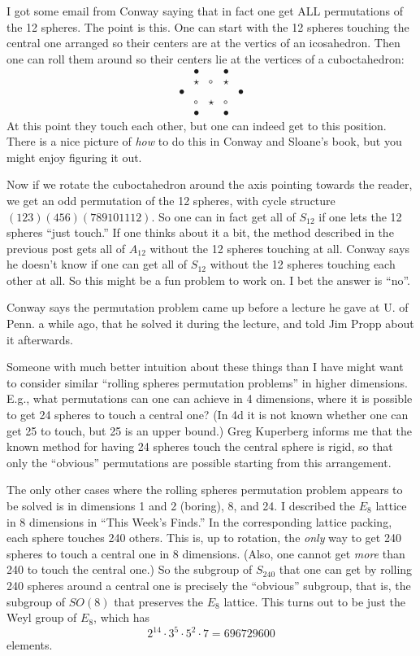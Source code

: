 \documentclass{article}
\begin{document}
I got some email from Conway saying that in fact one get ALL
permutations of the 12 spheres. The point is this. One can start with
the 12 spheres touching the central one arranged so their centers are at
the vertics of an icosahedron. Then one can roll them around so their
centers lie at the vertices of a cuboctahedron: \[
  \begin{array}{ccccc}
    &\bullet&&\bullet&
  \\&\star&\circ&\star&
  \\\bullet&&&&\bullet
  \\&\circ&\star&\circ&
  \\&\bullet&&\bullet&
  \end{array}
\] At this point they touch each other, but one can indeed get to this
position. There is a nice picture of \emph{how} to do this in Conway and
Sloane's book, but you might enjoy figuring it out.

Now if we rotate the cuboctahedron around the axis pointing towards the
reader, we get an odd permutation of the 12 spheres, with cycle
structure \((1 2 3)(4 5 6)(7 8 9 10 11 12)\). So one can in fact get all
of \(S_{12}\) if one lets the 12 spheres ``just touch.'' If one thinks
about it a bit, the method described in the previous post gets all of
\(A_{12}\) without the 12 spheres touching at all. Conway says he
doesn't know if one can get all of \(S_{12}\) without the 12 spheres
touching each other at all. So this might be a fun problem to work on. I
bet the answer is ``no''.

Conway says the permutation problem came up before a lecture he gave at
U. of Penn. a while ago, that he solved it during the lecture, and told
Jim Propp about it afterwards.

Someone with much better intuition about these things than I have might
want to consider similar ``rolling spheres permutation problems'' in
higher dimensions. E.g., what permutations can one can achieve in 4
dimensions, where it is possible to get 24 spheres to touch a central
one? (In 4d it is not known whether one can get 25 to touch, but 25 is
an upper bound.) Greg Kuperberg informs me that the known method for
having 24 spheres touch the central sphere is rigid, so that only the
``obvious'' permutations are possible starting from this arrangement.

The only other cases where the rolling spheres permutation problem
appears to be solved is in dimensions 1 and 2 (boring), 8, and 24. I
described the \(E_8\) lattice in 8 dimensions in ``This Week's Finds.''
In the corresponding lattice packing, each sphere touches 240 others.
This is, up to rotation, the \emph{only} way to get 240 spheres to touch
a central one in 8 dimensions. (Also, one cannot get \emph{more} than
240 to touch the central one.) So the subgroup of \(S_{240}\) that one
can get by rolling 240 spheres around a central one is precisely the
``obvious'' subgroup, that is, the subgroup of \(SO(8)\) that preserves
the \(E_8\) lattice. This turns out to be just the Weyl group of
\(E_8\), which has \[2^{14}\cdot 3^5\cdot 5^2\cdot 7 = 696729600\]
elements.
\end{document}
